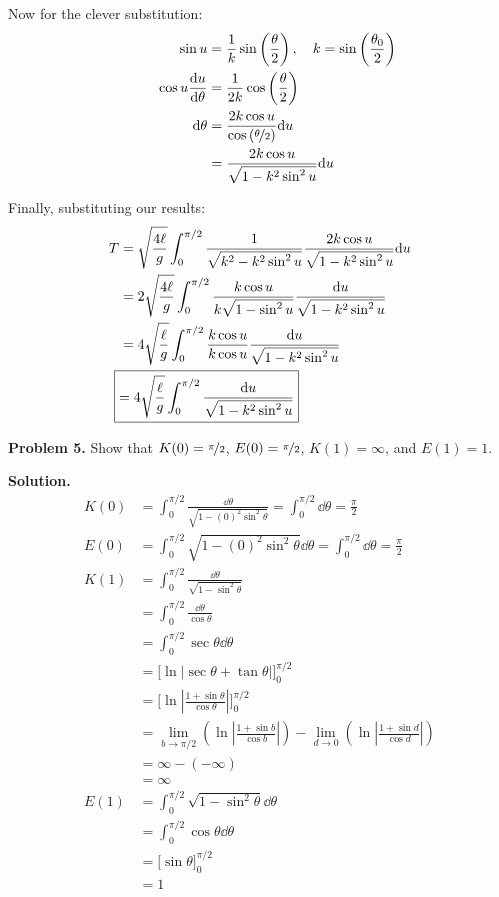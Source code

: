 \documentclass{article}
\begin{document}
Now for the clever substitution:
\begin{equation*}
\begin{aligned}
\quad\quad\quad\quad\sin u &= \frac{1}{k}\sin\left(\frac{\theta}{2}\right), \quad k = \sin\left(\frac{\theta_0}{2}\right) \\
\cos u \frac{\dd u}{\dd\theta} &= \frac{1}{2k}\cos\left(\frac{\theta}{2}\right) \\
\dd\theta &= \frac{2k\cos u}{\cos\left(\nicefrac{\theta}{2}\right)}\dd u \\
&= \frac{2k\cos u}{\sqrt{1-k^2\sin^2 u}}\dd u
\end{aligned}
\end{equation*}

Finally, substituting our results:
\begin{equation*}
\begin{aligned}
T &= \sqrt{\frac{4\ell}{g}}\int_{0}^{\pi/2}\frac{1}{\sqrt{k^2-k^2\sin^2u}}\frac{2k\cos u}{\sqrt{1-k^2\sin^2 u}}\dd u \\
&= 2\sqrt{\frac{4\ell}{g}}\int_{0}^{\pi/2}\frac{k\cos u}{k\sqrt{1-\sin^2u}}\frac{\dd u}{\sqrt{1-k^2\sin^2 u}} \\
&= 4\sqrt{\frac{\ell}{g}}\int_{0}^{\pi/2}\frac{k\cos u}{k\cos u}\frac{\dd u}{\sqrt{1-k^2\sin^2 u}} \\
\Aboxed{&= 4\sqrt{\frac{\ell}{g}}\int_{0}^{\pi/2}\frac{\dd u}{\sqrt{1-k^2\sin^2 u}}}
\end{aligned}
\end{equation*}

\textbf{Problem 5.} Show that $K(0) = \nicefrac{\pi}{2}$, $E(0) = \nicefrac{\pi}{2}$, $K(1) = \infty$, and $E(1) = 1$.

\textbf{Solution.}
\begin{equation*}
\begin{aligned}
K(0) &= \int_{0}^{\pi/2}\frac{\dd\theta}{\sqrt{1 - (0)^2\sin^2\theta}} = \int_{0}^{\pi/2}\dd\theta = \frac{\pi}{2} \\
E(0) &= \int_{0}^{\pi/2}\sqrt{1 - (0)^2\sin^2\theta}\dd\theta = \int_{0}^{\pi/2}\dd\theta = \frac{\pi}{2} \\
K(1) &= \int_{0}^{\pi/2}\frac{\dd\theta}{\sqrt{1-\sin^2\theta}} \\
&= \int_{0}^{\pi/2}\frac{\dd\theta}{\cos\theta} \\
&= \int_{0}^{\pi/2}\sec\theta\dd\theta \\
&= \Bigg[\ln|\sec\theta+\tan\theta|\Bigg]_0^{\pi/2} \\
&= \Bigg[\ln\left|\frac{1+\sin\theta}{\cos\theta}\right|\Bigg]_0^{\pi/2} \\
&= \lim_{b\to{\pi/2}}\left(\ln\left|\frac{1+\sin b}{\cos b}\right|\right) - \lim_{d\to 0}\left(\ln\left|\frac{1+\sin d}{\cos d}\right|\right) \\
&= \infty - (-\infty) \\
&= \infty \\
E(1) &= \int_{0}^{\pi/2}\sqrt{1-\sin^2\theta}\dd\theta \\
&= \int_{0}^{\pi/2}\cos\theta\dd\theta \\
&= \Bigg[\sin\theta\Bigg]_0^{\pi/2} \\
&= 1
\end{aligned}
\end{equation*}
\end{document}
